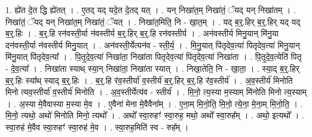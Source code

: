 \documentclass[17pt]{extarticle}
\begin{document}
1. ह्ये॑त दे॒त द्धि ह्ये॑तत् । . ए॒तद् यद् यदे॒त दे॒तद् यत् । . यन् निखा॑त॒म् निखा॑तं॒ ॅयद् यन् निखा॑तम् । . निखा॑तं॒ ॅयद् यन् निखा॑त॒म् निखा॑तं॒ ॅयत् । . निखा॑त॒मिति॒ नि - खा॒त॒म् । . यद् ब॒र्॒.हिर् ब॒र्॒.हिर् यद् यद् ब॒र्॒.हिः । . ब॒र्॒.हि रन॑वस्ती॒र्या न॑वस्तीर्य ब॒र्॒.हिर् ब॒र्॒.हि रन॑वस्तीर्य । . अन॑वस्तीर्य मिनु॒यान् मि॑नु॒या दन॑वस्ती॒र्या न॑वस्तीर्य मिनु॒यात् । . अन॑वस्ती॒र्येत्यन॑व - स्ती॒र्य॒ । . मि॒नु॒यात् पि॑तृदेव॒त्या॑ पितृदेव॒त्या॑ मिनु॒यान् मि॑नु॒यात् पि॑तृदेव॒त्या᳚ । . पि॒तृ॒दे॒व॒त्या॑ निखा॑ता॒ निखा॑ता पितृदेव॒त्या॑ पितृदेव॒त्या॑ निखा॑ता । . पि॒तृ॒दे॒व॒त्येति॑ पितृ - दे॒व॒त्या᳚ । . निखा॑ता स्याथ् स्या॒न् निखा॑ता॒ निखा॑ता स्यात् । . निखा॒तेति॒ नि - खा॒ता॒ । . स्या॒द् ब॒र्॒.हिर् ब॒र्॒.हिः स्या᳚थ् स्याद् ब॒र्॒.हिः । . ब॒र्॒.हि र॑व॒स्तीर्या॑ व॒स्तीर्य॑ ब॒र्॒.हिर् ब॒र्॒.हि र॑व॒स्तीर्य॑ । . अ॒व॒स्तीर्य॑ मिनोति मिनो त्यव॒स्तीर्या॑ व॒स्तीर्य॑ मिनोति । . अ॒व॒स्तीर्येत्य॑व - स्तीर्य॑ । . मि॒नो॒ त्य॒स्या म॒स्याम् मि॑नोति मिनो त्य॒स्याम् । . अ॒स्या मे॒वैवास्या म॒स्या मे॒व । . ए॒वैना॑ मेना मे॒वैवैना᳚म् । . ए॒ना॒म् मि॒नो॒ति॒ मि॒नो॒ त्ये॒ना॒ मे॒ना॒म् मि॒नो॒ति॒ । . मि॒नो॒ त्यथो॒ अथो॑ मिनोति मिनो॒ त्यथो᳚ । . अथो᳚ स्वा॒रुहꣳ॑ स्वा॒रुह॒ मथो॒ अथो᳚ स्वा॒रुह᳚म् । . अथो॒ इत्यथो᳚ । . स्वा॒रुह॑ मे॒वैव स्वा॒रुहꣳ॑ स्वा॒रुह॑ मे॒व । . स्वा॒रुह॒मिति॑ स्व - रुह᳚म् । \newline
\end{document}
